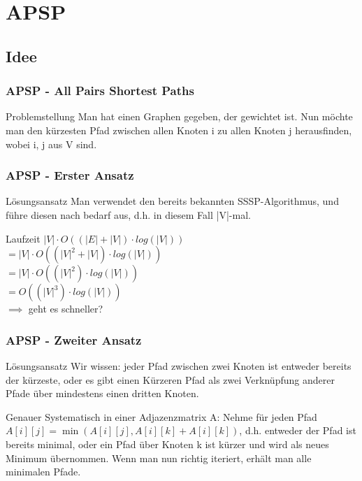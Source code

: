 \section{APSP} 

\subsection{Idee} 

\begin{frame}
\frametitle{APSP - All Pairs Shortest Paths}
\begin{block}{Problemstellung}
Man hat einen Graphen gegeben, der gewichtet ist. Nun möchte man den kürzesten Pfad zwischen allen Knoten i zu allen Knoten j herausfinden, wobei i, j aus V sind.
\end{block}
\end{frame}


\begin{frame}
\frametitle{APSP - Erster Ansatz}
\begin{block}{Lösungsansatz}
Man verwendet den bereits bekannten SSSP-Algorithmus, und führe diesen nach bedarf aus, d.h. in diesem Fall |V|-mal.
\end{block}

\begin{block}{Laufzeit}
$|V| \cdot O ((|E| + |V|) \cdot log(|V|))$\\$
= |V| \cdot O ((|V|^2 + |V|) \cdot log(|V|))$\\$
= |V| \cdot O ((|V|^2) \cdot log(|V|)) $\\$
= O ((|V|^3) \cdot log(|V|))$\\
$\implies$ geht es schneller?
\end{block}
\end{frame}


\begin{frame}
\frametitle{APSP - Zweiter Ansatz}
\begin{block}{Lösungsansatz}
Wir wissen: jeder Pfad zwischen zwei Knoten ist entweder bereits der kürzeste, oder es gibt einen Kürzeren Pfad als zwei Verknüpfung anderer Pfade über mindestens einen dritten Knoten.
\end{block}

\begin{block}{Genauer}
Systematisch in einer Adjazenzmatrix A:
Nehme für jeden Pfad $A[i][j] = \min\left(A[i][j], A[i][k] + A[i][k]\right)$, d.h. entweder der Pfad ist bereits minimal, oder ein Pfad über Knoten k ist kürzer und wird als neues Minimum übernommen.
Wenn man nun richtig iteriert, erhält man alle minimalen Pfade.
\end{block}
\end{frame}

